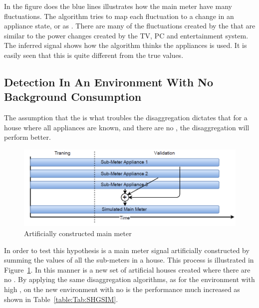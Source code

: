 In the figure does the blue lines illustrates how the main meter have many fluctuations. The algorithm tries to map each fluctuation to a change in an appliance state, or as . There are many of the fluctuations created by the  that are similar to the power changes created by the TV, PC and entertainment system. The inferred signal shows how the algorithm thinks the appliances is used. It is easily seen that this is quite different from the true values. 

\subsection{Detection In An Environment With No Background Consumption}
\label{sec:NOISEFREE}
The assumption that the  is what troubles the disaggregation dictates that for a house where all appliances are known, and there are no , the disaggregation will perform better. 

\begin{figure}[H]
\centering
\includegraphics[width=1\textwidth]{billeder/SimIllu.png}
\caption{Artificially constructed main meter}
\label{fig:SIL}
\end{figure}

In order to test this hypothesis is a main meter signal artificially constructed by summing the values of all the sub-meters in a house. This process is illustrated in Figure~\ref{fig:SIL}. In this manner is a new set of artificial houses created where there are no . By applying the same disaggregation algorithms, as for the environment with high , on the new environment with no  is the performance much increased as shown in Table~\ref{table:Tab:SHGSIM}.

  

